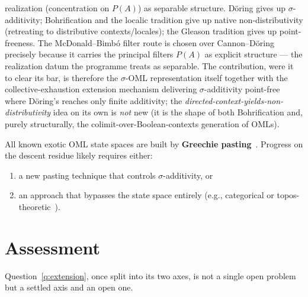 \documentclass[11pt]{article}
\theoremstyle{definition}
\begin{document}
realization (concentration on $P(A)$) as separable structure. D\"{o}ring
gives up $\sigma$-additivity; Bohrification and the localic tradition
give up native non-distributivity (retreating to distributive
contexts/locales); the Gleason tradition gives up point-freeness. The
McDonald--Bimb\'{o} filter route is chosen over Cannon--D\"{o}ring
precisely because it carries the principal filters $P(A)$ as explicit
structure --- the realization datum the programme treats as separable.
The contribution, were it to clear its bar, is therefore the
$\sigma$-OML representation itself together with the
collective-exhaustion extension mechanism delivering
$\sigma$-additivity point-free where D\"{o}ring's reaches only finite
additivity; the \emph{directed-context-yields-non-distributivity} idea
on its own is \emph{not} new (it is the shape of both Bohrification and,
purely structurally, the colimit-over-Boolean-contexts generation of
OMLs).

All known exotic OML state spaces are built by \textbf{Greechie
pasting}~\cite{Wilce2009, Shultz1974, Ptak1987}.  Progress on the
descent residue likely requires either:
\begin{enumerate}[label=(\alph*)]
  \item a new pasting technique that controls $\sigma$-additivity,
    or
  \item an approach that bypasses the state space entirely (e.g.,
    categorical or
    topos-theoretic~\cite{DoeringIsham2008}).
\end{enumerate}

\section{Assessment}
\label{sec:assessment}

Question~\ref{q:extension}, once split into its two axes, is not a
single open problem but a settled axis and an open one.
\end{document}

